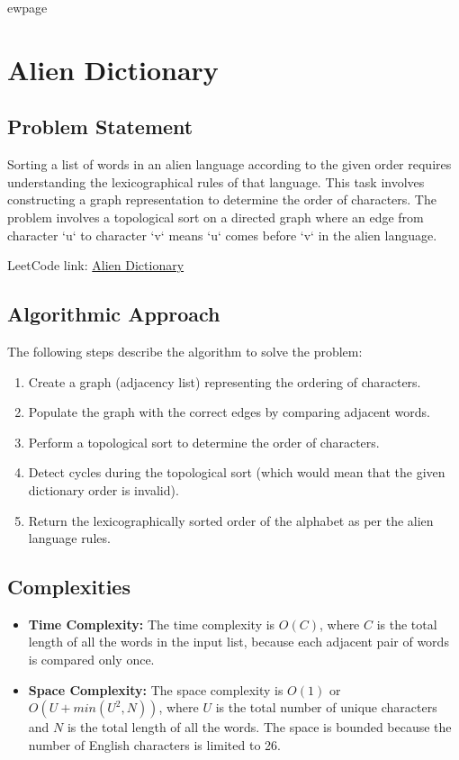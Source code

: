 
ewpage
\chapter{Alien Dictionary}
\label{chap:alien_dictionary}

\section*{Problem Statement}
Sorting a list of words in an alien language according to the given order requires understanding the lexicographical rules of that language. This task involves constructing a graph representation to determine the order of characters. The problem involves a topological sort on a directed graph where an edge from character `u` to character `v` means `u` comes before `v` in the alien language.

LeetCode link: \href{https://leetcode.com/problems/alien-dictionary/}{Alien Dictionary}

\section*{Algorithmic Approach}
The following steps describe the algorithm to solve the problem:
\begin{enumerate}
	\item Create a graph (adjacency list) representing the ordering of characters.
	\item Populate the graph with the correct edges by comparing adjacent words.
	\item Perform a topological sort to determine the order of characters.
	\item Detect cycles during the topological sort (which would mean that the given dictionary order is invalid).
	\item Return the lexicographically sorted order of the alphabet as per the alien language rules.
\end{enumerate}

\section*{Complexities}
\begin{itemize}
	\item \textbf{Time Complexity:} The time complexity is \(O(C)\), where \(C\) is the total length of all the words in the input list, because each adjacent pair of words is compared only once.
	\item \textbf{Space Complexity:} The space complexity is \(O(1)\) or \(O(U + min(U^2, N))\), where \(U\) is the total number of unique characters and \(N\) is the total length of all the words. The space is bounded because the number of English characters is limited to 26.
\end{itemize}


